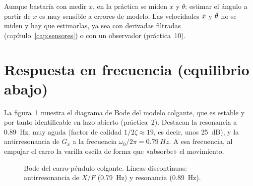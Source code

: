 \begin{aviso}
Aunque bastaría con medir $x$, en la práctica se miden $x$ y $\theta$: estimar el ángulo a partir de $x$ es muy sensible a errores de modelo. Las velocidades $\dot{x}$ y $\dot{\theta}$ no se miden y hay que estimarlas, ya sea con derivadas filtradas (capítulo~\ref{cap:sensores}) o con un observador (práctica~10).
\end{aviso}

\section{Respuesta en frecuencia (equilibrio abajo)}

La figura~\ref{fig:bode} muestra el diagrama de Bode del modelo colgante, que es estable y por tanto identificable en lazo abierto (práctica~2). Destacan la resonancia a \SI{0.89}{Hz}, muy aguda (factor de calidad $1/2\zeta\approx19$, es decir, unos \SI{25}{dB}), y la antirresonancia de $G_x$ a la frecuencia $\omega_0/2\pi=\SI{0.79}{Hz}$. A esa frecuencia, al empujar el carro la varilla oscila de forma que «absorbe» el movimiento.

\begin{figure}[H]
\centering
{}
\caption{Bode del carro-péndulo colgante. Líneas discontinuas: antirresonancia de $X/F$ (\SI{0.79}{Hz}) y resonancia (\SI{0.89}{Hz}).}
\label{fig:bode}
\end{figure}
